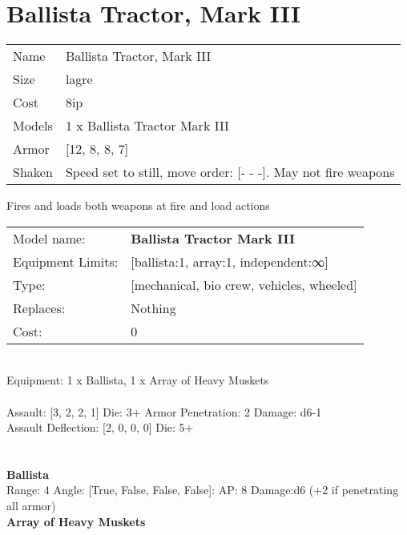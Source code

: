 \pagebreak\pagebreak

\section{ Ballista Tractor, Mark III }

\begin{tabular}{ll}
  Name & Ballista Tractor, Mark III \\
  Size & lagre\\
  Cost & 8ip\\
  Models & 1 x Ballista Tractor Mark III\\
  Armor & [12, 8, 8, 7]\\
  Shaken & Speed set to still, move order: [- - -]. May not fire weapons\\
\end{tabular}

\noindent Fires and loads both weapons at fire and load actions\\ 


\noindent
\begin{tabular}{ll}
Model name: &{\bf Ballista Tractor Mark III } \\
Equipment Limits: &[ballista:1, array:1, independent:∞] \\
Type: &[mechanical, bio crew, vehicles, wheeled] \\
Replaces: &Nothing \\
Cost: & 0\\
\end{tabular}
\ \\
Equipment: 1 x Ballista, 1 x Array of Heavy Muskets \\
\ \\
Assault: [3, 2, 2, 1] Die: 3+ Armor Penetration: 2 Damage: d6-1 \\
Assault Deflection: [2, 0, 0, 0] Die: 5+\\
\indent  
\ \\

\ \\
{\bf Ballista } \\



Range: 4  Angle: [True, False, False, False]: AP: 8 Damage:d6 (+2 if penetrating all armor) \\




{\bf Array of Heavy Muskets } \\



